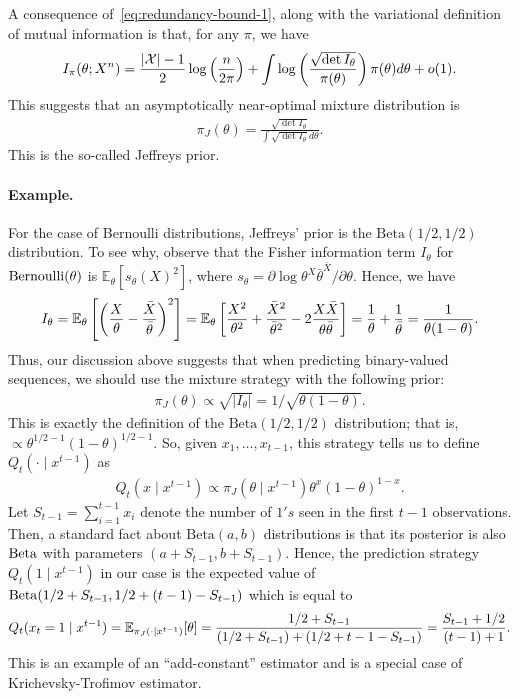 \documentclass[12pt]{article}
\begin{document}
    A consequence of~\eqref{eq:redundancy-bound-1}, along with the variational definition of mutual information is that, for any $\pi$, we have 
    \begin{align}
        I_\pi(\theta; X^n) = \frac{|{\cal X}|-1}{2} \log \left( \frac{n}{2\pi} \right) + \int \log \left(  \frac{\sqrt{\det I_\theta}}{\pi(\theta)}\right) \pi(\theta) d\theta + o(1). 
    \end{align}
    This suggests that an asymptotically near-optimal mixture distribution is 
    \begin{align}
        \pi_J(\theta) = \frac{\sqrt{\det I_\theta}}{\int \sqrt{\det I_\theta} d\theta}. 
    \end{align}
    This is the so-called Jeffreys prior. 
    
\paragraph{Example.} For the case of Bernoulli distributions, Jeffreys' prior is the $\mathrm{Beta}(1/2, 1/2)$ distribution. To see why, observe that the Fisher information term $I_\theta$ for $\mathrm{Bernoulli}(\theta)$  is $\mathbb{E}_\theta[s_\theta(X)^2]$, where $s_\theta = \partial \log \theta^X\bar{\theta}^{\bar{X}}/\partial \theta$. Hence, we have 
\begin{align}
    I_\theta = \mathbb{E}_\theta \left[ \left( \frac{X}{\theta} - \frac{\bar{X}}{\bar{\theta}} \right)^2 \right] = \mathbb{E}_\theta\left[ \frac{X^2}{\theta^2} + \frac{\bar{X}^2}{\bar{\theta}^2}  - 2 \frac{X \bar{X}}{\theta \bar{\theta}}\right] = \frac{1}{\theta} + \frac 1 {\bar{\theta}} = \frac{1}{\theta (1-\theta)}. 
\end{align}
Thus, our discussion above suggests that when predicting binary-valued sequences, we should use the mixture strategy with the following prior: 
\begin{align}
    \pi_J(\theta) \propto \sqrt{|I_\theta|} = 1/\sqrt{\theta(1-\theta)}. 
\end{align}
This is exactly the definition of the $\mathrm{Beta}(1/2, 1/2)$ distribution; that is, $\propto \theta^{1/2-1} (1-\theta)^{1/2-1}$. So, given $x_1, \ldots, x_{t-1}$, this strategy tells us to define $Q_t(\cdot \mid x^{t-1})$ as 
\begin{align}
    Q_t(x \mid x^{t-1}) \propto \pi_J(\theta \mid x^{t-1}) \theta^{x}(1-\theta)^{1-x}. 
\end{align}
Let $S_{t-1} = \sum_{i=1}^{t-1} x_i$ denote the number of $1's$ seen in the first $t-1$ observations. Then, a standard fact about $\mathrm{Beta}(a,b)$ distributions is that its posterior is also $\mathrm{Beta}$ with parameters $(a + S_{t-1}, b+S_{t-1})$. Hence, the prediction strategy $Q_t(1 \mid x^{t-1})$ in our case is the expected value of $\mathrm{Beta}(1/2 + S_{t-1}, 1/2 + (t-1) - S_{t-1})$ which is equal to 
\begin{align}
    Q_t(x_t=1 \mid x^{t-1}) = \mathbb{E}_{\pi_J(\cdot \mid x^{t-1})}[\theta] = \frac{1/2 + S_{t-1}}{\left( 1/2 + S_{t-1} \right) + \left( 1/2 +  t-1  - S_{t-1}\right)} = \frac{S_{t-1} + 1/2}{(t-1) + 1}. 
\end{align}
This is an example of an ``add-constant'' estimator and is a special case of Krichevsky-Trofimov estimator. 
\end{document}
